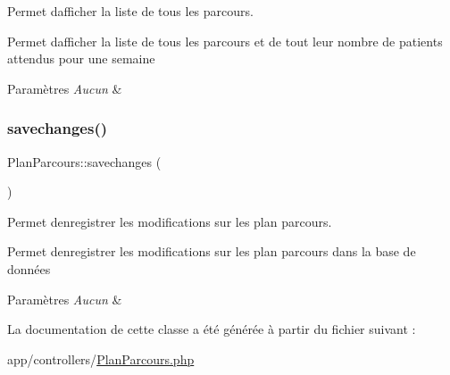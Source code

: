 Permet d\textquotesingle{}afficher la liste de tous les parcours. 

Permet d\textquotesingle{}afficher la liste de tous les parcours et de tout leur nombre de patients attendus pour une semaine 
\begin{DoxyParams}{Paramètres}
{\em Aucun} & \\
\hline
\end{DoxyParams}
\mbox{\label{class_plan_parcours_a59c363ad9d644b0f1ebefab3e08bab5a}} 
\subsubsection{\texorpdfstring{savechanges()}{savechanges()}}
{\footnotesize\ttfamily Plan\+Parcours\+::savechanges (\begin{DoxyParamCaption}{ }\end{DoxyParamCaption})}



Permet d\textquotesingle{}enregistrer les modifications sur les plan parcours. 

Permet d\textquotesingle{}enregistrer les modifications sur les plan parcours dans la base de données 
\begin{DoxyParams}{Paramètres}
{\em Aucun} & \\
\hline
\end{DoxyParams}


La documentation de cette classe a été générée à partir du fichier suivant \+:\begin{DoxyCompactItemize}
\item 
app/controllers/\hyperlink{_plan_parcours_8php}{Plan\+Parcours.\+php}\end{DoxyCompactItemize}
